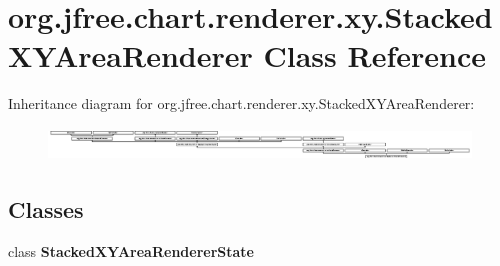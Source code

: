 \hypertarget{classorg_1_1jfree_1_1chart_1_1renderer_1_1xy_1_1_stacked_x_y_area_renderer}{}\section{org.\+jfree.\+chart.\+renderer.\+xy.\+Stacked\+X\+Y\+Area\+Renderer Class Reference}
\label{classorg_1_1jfree_1_1chart_1_1renderer_1_1xy_1_1_stacked_x_y_area_renderer}
Inheritance diagram for org.\+jfree.\+chart.\+renderer.\+xy.\+Stacked\+X\+Y\+Area\+Renderer\+:\begin{figure}[H]
\begin{center}
\leavevmode
\includegraphics[height=0.872274cm]{classorg_1_1jfree_1_1chart_1_1renderer_1_1xy_1_1_stacked_x_y_area_renderer}
\end{center}
\end{figure}
\subsection*{Classes}
\begin{DoxyCompactItemize}
\item 
class {\bfseries Stacked\+X\+Y\+Area\+Renderer\+State}
\end{DoxyCompactItemize}
